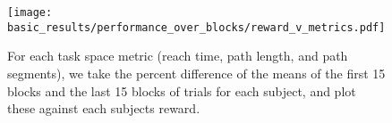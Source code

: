\documentclass[../main.tex]{subfiles}
\begin{document}

\begin{figure}[!htb]%
    \centering
    \texttt{[image: basic\_results/performance\_over\_blocks/reward\_v\_metrics.pdf]}
    \caption[Percent difference of path metrics versus reward]{For each task space metric (reach time, path length, and path segments), we take the percent difference of the means of the first 15 blocks and the last 15 blocks of trials for each subject, and plot these against each subjects reward.}\label{fig:reward_v_metrics}
\end{figure}

  
\end{document}
